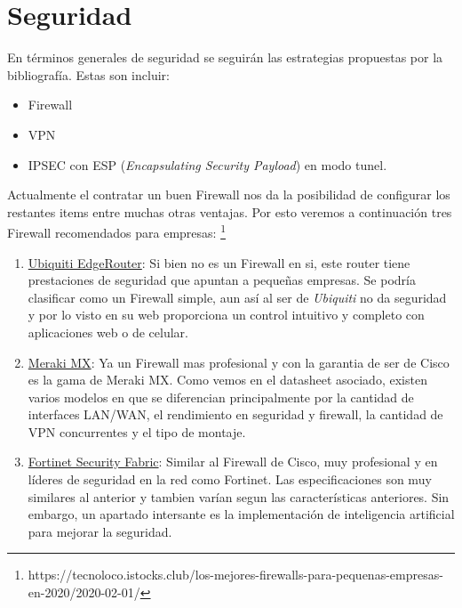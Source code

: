 \documentclass[11pt]{article}
\begin{document}
    \section{Seguridad}
    En términos generales de seguridad se seguirán las estrategias propuestas por la bibliografía. Estas son incluir:
    \begin{itemize}
        \item Firewall
        \item VPN
        \item IPSEC con ESP (\textit{Encapsulating Security Payload}) en modo tunel.
    \end{itemize}

    Actualmente el contratar un buen Firewall nos da la posibilidad de configurar los restantes items entre muchas otras ventajas. Por esto veremos a continuación tres Firewall
    recomendados para empresas: \footnote{https://tecnoloco.istocks.club/los-mejores-firewalls-para-pequenas-empresas-en-2020/2020-02-01/}

    \begin{enumerate}
        \item  \href{https://www.ui.com/edgemax/edgerouter/}{Ubiquiti EdgeRouter}: Si bien no es un Firewall en si, este router tiene prestaciones de seguridad que apuntan a pequeñas
        empresas. Se podría clasificar como un Firewall simple, aun así al ser de \textit{Ubiquiti} no da seguridad y por lo visto en su web proporciona 
        un control intuitivo y completo con aplicaciones web o de celular.
        \item \href{https://meraki.cisco.com/lib/pdf/meraki_datasheet_mx_es.pdf}{Meraki MX}: Ya un Firewall mas profesional y con la garantia de ser de Cisco es la gama de Meraki MX.
        Como vemos en el datasheet asociado, existen varios modelos en que se diferencian principalmente por la cantidad de interfaces LAN/WAN, el rendimiento en seguridad y firewall, la
        cantidad de VPN concurrentes y el tipo de montaje. 
        \item \href{https://www.fortinet.com/content/dam/fortinet/assets/white-papers/wp-security-fabric.pdf}{Fortinet Security Fabric}: Similar al Firewall de Cisco, muy profesional y
        en líderes de seguridad en la red como Fortinet. Las especificaciones son muy similares al anterior y tambien varían segun las características anteriores. Sin embargo, un apartado 
        intersante es la implementación de inteligencia artificial para mejorar la seguridad.
    \end{enumerate}
\end{document}
